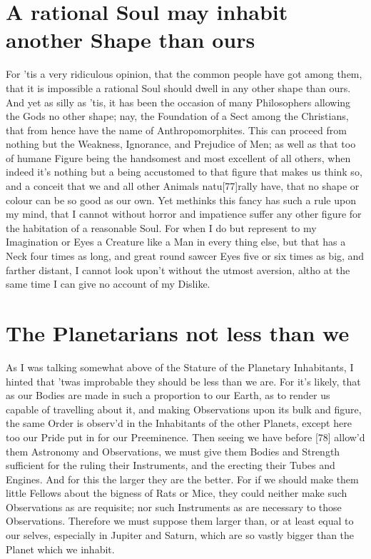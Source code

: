 \documentclass[letterpaper]{book}
\begin{document}
\section{A rational Soul may inhabit another Shape than ours}

For 'tis a very ridiculous opinion, that the common people have got among
them, that it is impossible a rational Soul should dwell in any other shape
than ours. And yet as silly as 'tis, it has been the occasion of many
Philosophers allowing the Gods no other shape; nay, the Foundation of a
Sect among the Christians, that from hence have the name of
Anthropomorphites. This can proceed from nothing but the Weakness,
Ignorance, and Prejudice of Men; as well as that too of humane Figure being
the handsomest and most excellent of all others, when indeed it's nothing
but a being accustomed to that figure that makes us think so, and a conceit
that we and all other Animals natu[77]rally have, that no shape or colour
can be so good as our own. Yet methinks this fancy has such a rule upon my
mind, that I cannot without horror and impatience suffer any other figure
for the habitation of a reasonable Soul. For when I do but represent to my
Imagination or Eyes a Creature like a Man in every thing else, but that has a
Neck four times as long, and great round sawcer Eyes five or six times as
big, and farther distant, I cannot look upon't without the utmost aversion,
altho at the same time I can give no account of my Dislike.


\section{The Planetarians not less than we}

As I was talking somewhat above of the Stature of the Planetary Inhabitants,
I hinted that 'twas improbable they should be less than we are. For it's
likely, that as our Bodies are made in such a proportion to our Earth, as to
render us capable of travelling about it, and making Observations upon its
bulk and figure, the same Order is observ'd in the Inhabitants of the other
Planets, except here too our Pride put in for our Preeminence. Then seeing
we have before [78] allow'd them Astronomy and Observations, we must
give them Bodies and Strength sufficient for the ruling their Instruments,
and the erecting their Tubes and Engines. And for this the larger they are
the better. For if we should make them little Fellows about the bigness of
Rats or Mice, they could neither make such Observations as are requisite;
nor such Instruments as are necessary to those Observations. Therefore we
must suppose them larger than, or at least equal to our selves, especially
in Jupiter and Saturn, which are so vastly bigger than the Planet which we
inhabit.
\end{document}

